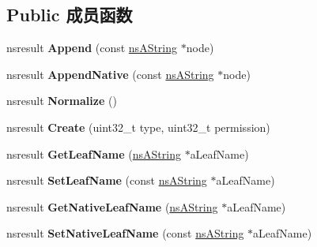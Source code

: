 \subsection*{Public 成员函数}
\begin{DoxyCompactItemize}
\item 
\mbox{\label{interfacens_i_file_a13320fdcb3248d4bcbc58094439467fa}} 
nsresult {\bfseries Append} (const \hyperlink{structns_string_container}{ns\+A\+String} $\ast$node)
\item 
\mbox{\label{interfacens_i_file_a7d7595b0f5e7ea1e717843f5a179737f}} 
nsresult {\bfseries Append\+Native} (const \hyperlink{structns_string_container}{ns\+A\+String} $\ast$node)
\item 
\mbox{\label{interfacens_i_file_a30d07bb44a353531ecb3de12f8a69ba1}} 
nsresult {\bfseries Normalize} ()
\item 
\mbox{\label{interfacens_i_file_a407cc3047fffae439e18c1120cefd17f}} 
nsresult {\bfseries Create} (uint32\+\_\+t type, uint32\+\_\+t permission)
\item 
\mbox{\label{interfacens_i_file_a25082111db24e52bfb7b0f8c1d3adb68}} 
nsresult {\bfseries Get\+Leaf\+Name} (\hyperlink{structns_string_container}{ns\+A\+String} $\ast$a\+Leaf\+Name)
\item 
\mbox{\label{interfacens_i_file_a7c870126716576cfc8216e2af2b084fb}} 
nsresult {\bfseries Set\+Leaf\+Name} (const \hyperlink{structns_string_container}{ns\+A\+String} $\ast$a\+Leaf\+Name)
\item 
\mbox{\label{interfacens_i_file_a287b74e930f7c32feb5c681d22580157}} 
nsresult {\bfseries Get\+Native\+Leaf\+Name} (\hyperlink{structns_string_container}{ns\+A\+String} $\ast$a\+Leaf\+Name)
\item 
\mbox{\label{interfacens_i_file_a8b85931a63c1c498c6275a72a9c433fa}} 
nsresult {\bfseries Set\+Native\+Leaf\+Name} (const \hyperlink{structns_string_container}{ns\+A\+String} $\ast$a\+Leaf\+Name)
\item 
\mbox{\label{interfacens_i_file_a57d5b79bc05348ba21d0b866708e3d73}} 

\end{DoxyCompactItemize}
